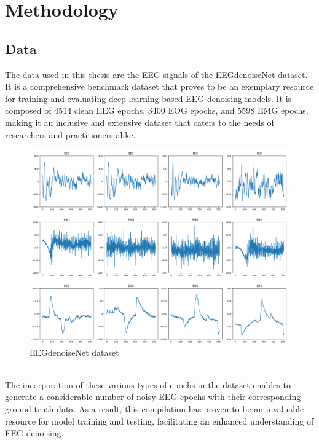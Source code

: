 \documentclass[a4paper, noexaminfo]{sapthesis}
\begin{document}
\chapter{Methodology}
\section{Data}\label{sec:data}
The data used in this thesis are the EEG signals of the EEGdenoiseNet 
dataset\cite{EEGdenoiseNet}. It is a comprehensive benchmark dataset
 that proves to be an exemplary resource for training and evaluating
  deep learning-based EEG denoising models. It is composed of 4514 clean 
  EEG epochs, 3400 EOG epochs, and 5598 EMG epochs, making it an inclusive 
  and extensive dataset that caters to the needs of researchers and
 practitioners alike.
 \begin{figure}[h!]
  \centering
  \includegraphics[width=1\textwidth]{images/raw_data_example.png}
  \caption{EEGdenoiseNet dataset}
  \label{fig:raw_data}
\end{figure}
\newline \\
The incorporation of these various types of epochs in the dataset
enables to generate a considerable number of noisy EEG epochs
with their corresponding ground truth data. As a result, this compilation 
has proven to be an invaluable resource for model training and testing,
 facilitating an enhanced understanding of EEG denoising.
\end{document}
